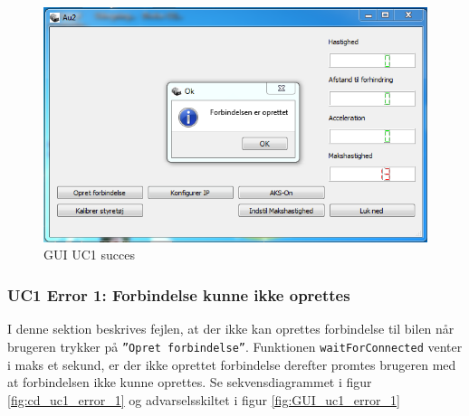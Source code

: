 \begin{figure}[H]
\centering
\includegraphics[width=\textwidth* 3/4,height=\textwidth* 9/20 ]{../fig/billeder/gui_uc1_success.png}
\caption{GUI UC1 succes}
\label{fig:GUI_uc1_success}
\end{figure}


\subsubsection{UC1 Error 1: Forbindelse kunne ikke oprettes}
I denne sektion beskrives fejlen, at der ikke kan oprettes forbindelse til bilen når brugeren trykker på \texttt{''Opret forbindelse''}. Funktionen \texttt{waitForConnected} venter i maks et sekund, er der ikke oprettet forbindelse derefter promtes brugeren med at forbindelsen ikke kunne oprettes. Se sekvensdiagrammet i figur \ref{fig:cd_uc1_error_1} og advarselsskiltet i figur \ref{fig:GUI_uc1_error_1}

